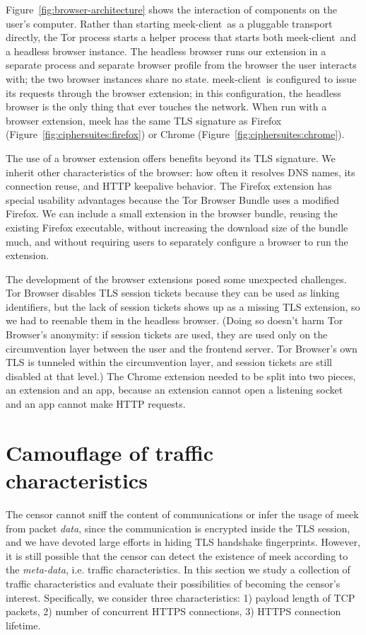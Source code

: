 \documentclass{article}
\def\meekclient{\mbox{meek-client}}
\begin{document}
Figure~\ref{fig:browser-architecture} shows the interaction of components
on the user's computer.
Rather than starting \meekclient\ as a pluggable transport directly, the Tor
process starts a helper process that starts both \meekclient\
and a headless browser instance.
The headless browser runs our extension in a separate
process and separate browser profile from the browser the
user interacts with; the two browser instances share no state.
\meekclient\ is configured to issue its requests through the browser extension;
in this configuration, the headless browser is the only thing that ever touches the network.
When run with a browser extension, meek has the same TLS signature
as Firefox (Figure~\ref{fig:ciphersuites:firefox}) or
Chrome (Figure~\ref{fig:ciphersuites:chrome}).

The use of a browser extension offers benefits beyond its TLS signature.
We inherit other characteristics of the browser:
how often it resolves DNS names,
its connection reuse,
and HTTP keepalive behavior.
The Firefox extension has special usability advantages because the Tor Browser Bundle
uses a modified Firefox.
We can include a small extension in the browser bundle, reusing the existing
Firefox executable, without increasing the download size of the bundle much,
and without requiring users to separately configure a browser to run the extension.

The development of the browser extensions posed some unexpected challenges.
Tor Browser disables TLS session tickets because they can be used as linking identifiers,
but the lack of session tickets shows up as a missing TLS extension,
so we had to reenable them in the headless browser.
(Doing so doesn't harm Tor Browser's anonymity:
if session tickets are used, they are used only on the circumvention layer
between the user and the frontend server. Tor Browser's own TLS is tunneled
within the circumvention layer, and session tickets are still disabled at that level.)
The Chrome extension needed to be split into two pieces, an extension and an app,
because an extension cannot open a listening socket and an app cannot make HTTP requests.

\section{Camouflage of traffic characteristics}
\label{sec:trafficstatistics}

The censor cannot sniff the content of communications or infer the usage of meek 
from packet \emph{data}, 
since the communication is encrypted inside the TLS session, and we have devoted large efforts 
in hiding TLS handshake fingerprints. However, it is still possible that the censor can detect 
the existence of meek according to the \emph{meta-data}, i.e. traffic characteristics. 
In this section we study a collection of traffic characteristics and evaluate their possibilities of becoming
the censor's interest. Specifically, we consider three characteristics: 1) payload length of
TCP packets, 2) number of concurrent HTTPS connections, 3) HTTPS connection lifetime. 
\end{document}
